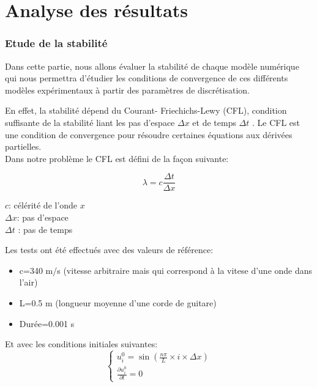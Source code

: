 \part{Analyse des résultats}


\section{Etude de la stabilité}

Dans cette partie, nous allons évaluer la stabilité de chaque modèle numérique qui nous permettra d'étudier les conditions de convergence de ces différents modèles expérimentaux à partir des paramètres de discrétisation.


En effet, la stabilité dépend du Courant- Friechichs-Lewy (CFL), condition suffisante de la stabilité liant les pas d'espace $\Delta x $ et de temps $\Delta t$ . Le CFL est une condition de convergence pour résoudre certaines équations aux dérivées partielles.\\

Dans notre problème le CFL est défini de la façon suivante:

\begin{minipage}{.6\textwidth}%
\centering
\begin{equation*}
     \lambda= c \frac{\Delta t}{\Delta x}  
\end{equation*}

\end{minipage}
\hfill
\begin{minipage}{.45\textwidth}%
\vspace{7mm}
$c$: célérité de l'onde $x$\\
$\Delta x$: pas d'espace\\
$\Delta t$ : pas de temps\\
     
\end{minipage}

Les tests ont été effectués avec des valeurs de référence:
\begin{itemize}
    \item c=340 m/s (vitesse arbitraire mais qui correspond à la vitese d'une onde dans l'air)
    \item L=0.5 m (longueur moyenne d'une corde de guitare)
    \item Durée=0.001 s\\ 
\end{itemize}
Et avec les conditions initiales suivantes:
  \[
      \begin{cases}
        u^{0}_{i}=\sin(\frac{n \pi }{L} \times i \times \Delta x) \\
        \frac{\partial u^0_{i}}{\partial t}= 0
      \end{cases}
    \]\\


